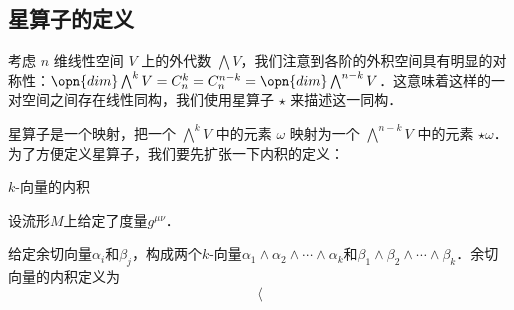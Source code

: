 


\subsection{星算子的定义}

考虑 $n$ 维线性空间 $V$ 上的外代数 $\bigwedge V$，我们注意到各阶的外积空间具有明显的对称性：$\opn{dim}\bigwedge^k V=C^k_n=C^{n-k}_n=\opn{dim}\bigwedge^{n-k} V$．这意味着这样的一对空间之间存在线性同构，我们使用星算子 $\star$ 来描述这一同构．

星算子是一个映射，把一个 $\bigwedge^k V$ 中的元素 $\omega$ 映射为一个 $\bigwedge^{n-k} V$ 中的元素 $\star\omega$．为了方便定义星算子，我们要先扩张一下内积的定义：


\begin{definition}{$k$-向量的内积}

设流形$M$上给定了度量$g^{\mu\nu}$．

给定余切向量$\alpha_i$和$\beta_j$，构成两个$k$-向量$\alpha_1\wedge\alpha_2\wedge\cdots\wedge\alpha_k$和$\beta_1\wedge\beta_2\wedge\cdots\wedge\beta_k$．余切向量的内积定义为
\begin{equation}
\langle
\end{equation}

\end{definition}




